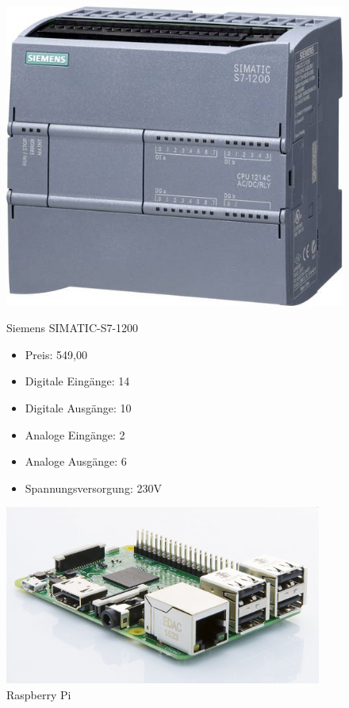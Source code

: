 \begin{figure}[H]
\begin{minipage}[t]{0.45\textwidth}
\includegraphics[width=\textwidth]{fig/S7}
\caption{Siemens SIMATIC-S7-1200}

\begin{itemize}
	\item{Preis: 549,00\textsf{\texteuro}} %
	\item{Digitale Eingänge: 14}
	\item{Digitale Ausgänge: 10}
	\item{Analoge Eingänge: 2}
	\item{Analoge Ausgänge: 6}
	\item{Spannungsversorgung: 230V}
\end{itemize}

\end{minipage}
\hspace{0.1\textwidth}
\begin{minipage}[t]{0.45\textwidth}

\includegraphics[width=0.93\textwidth]{fig/RPI}
\caption{Raspberry Pi}



\end{minipage}
\end{figure}
